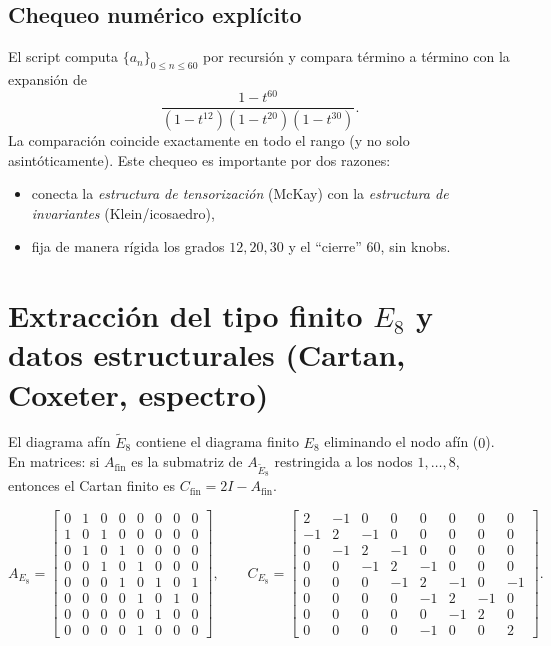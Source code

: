 \documentclass[11pt,a4paper]{article}
\theoremstyle{definition}
\theoremstyle{remark}
\begin{document}
\subsection{Chequeo numérico explícito}
El script computa $\{a_n\}_{0\le n\le 60}$ por recursión y compara término a término con la expansión de
\[
\frac{1-t^{60}}{(1-t^{12})(1-t^{20})(1-t^{30})}.
\]
La comparación coincide exactamente en todo el rango (y no solo asintóticamente).
Este chequeo es importante por dos razones:
\begin{itemize}
\item conecta la \emph{estructura de tensorización} (McKay) con la \emph{estructura de invariantes} (Klein/icosaedro),
\item fija de manera rígida los grados $12,20,30$ y el ``cierre'' $60$, sin knobs.
\end{itemize}

\section{Extracción del tipo finito $E_8$ y datos estructurales (Cartan, Coxeter, espectro)}
El diagrama afín $\widetilde{E}_8$ contiene el diagrama finito $E_8$ eliminando el nodo afín ($0$).
En matrices: si $A_{\mathrm{fin}}$ es la submatriz de $A_{\widetilde{E}_8}$ restringida a los nodos $1,\dots,8$,
entonces el Cartan finito es $C_{\mathrm{fin}}=2I-A_{\mathrm{fin}}$.

\[
A_{E_8}=
\begin{bmatrix}
0 & 1 & 0 & 0 & 0 & 0 & 0 & 0 \\
1 & 0 & 1 & 0 & 0 & 0 & 0 & 0 \\
0 & 1 & 0 & 1 & 0 & 0 & 0 & 0 \\
0 & 0 & 1 & 0 & 1 & 0 & 0 & 0 \\
0 & 0 & 0 & 1 & 0 & 1 & 0 & 1 \\
0 & 0 & 0 & 0 & 1 & 0 & 1 & 0 \\
0 & 0 & 0 & 0 & 0 & 1 & 0 & 0 \\
0 & 0 & 0 & 0 & 1 & 0 & 0 & 0
\end{bmatrix},
\qquad
C_{E_8}=
\begin{bmatrix}
2 & -1 & 0 & 0 & 0 & 0 & 0 & 0 \\
-1 & 2 & -1 & 0 & 0 & 0 & 0 & 0 \\
0 & -1 & 2 & -1 & 0 & 0 & 0 & 0 \\
0 & 0 & -1 & 2 & -1 & 0 & 0 & 0 \\
0 & 0 & 0 & -1 & 2 & -1 & 0 & -1 \\
0 & 0 & 0 & 0 & -1 & 2 & -1 & 0 \\
0 & 0 & 0 & 0 & 0 & -1 & 2 & 0 \\
0 & 0 & 0 & 0 & -1 & 0 & 0 & 2
\end{bmatrix}.
\]
\end{document}
